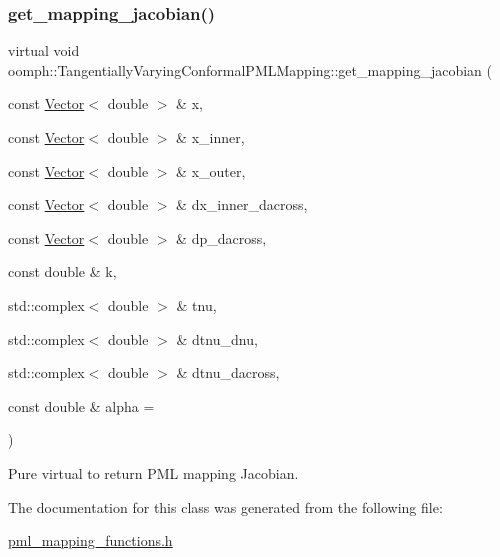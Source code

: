 \subsubsection{\texorpdfstring{get\+\_\+mapping\+\_\+jacobian()}{get\_mapping\_jacobian()}}
{\footnotesize\ttfamily virtual void oomph\+::\+Tangentially\+Varying\+Conformal\+P\+M\+L\+Mapping\+::get\+\_\+mapping\+\_\+jacobian (\begin{DoxyParamCaption}\item[{const \hyperlink{classoomph_1_1Vector}{Vector}$<$ double $>$ \&}]{x,  }\item[{const \hyperlink{classoomph_1_1Vector}{Vector}$<$ double $>$ \&}]{x\+\_\+inner,  }\item[{const \hyperlink{classoomph_1_1Vector}{Vector}$<$ double $>$ \&}]{x\+\_\+outer,  }\item[{const \hyperlink{classoomph_1_1Vector}{Vector}$<$ double $>$ \&}]{dx\+\_\+inner\+\_\+dacross,  }\item[{const \hyperlink{classoomph_1_1Vector}{Vector}$<$ double $>$ \&}]{dp\+\_\+dacross,  }\item[{const double \&}]{k,  }\item[{std\+::complex$<$ double $>$ \&}]{tnu,  }\item[{std\+::complex$<$ double $>$ \&}]{dtnu\+\_\+dnu,  }\item[{std\+::complex$<$ double $>$ \&}]{dtnu\+\_\+dacross,  }\item[{const double \&}]{alpha = {} }\end{DoxyParamCaption})\hspace{0.3cm}{\ttfamily [pure virtual]}}



Pure virtual to return P\+ML mapping Jacobian. 



The documentation for this class was generated from the following file\+:\begin{DoxyCompactItemize}
\item 
\hyperlink{pml__mapping__functions_8h}{pml\+\_\+mapping\+\_\+functions.\+h}\end{DoxyCompactItemize}

